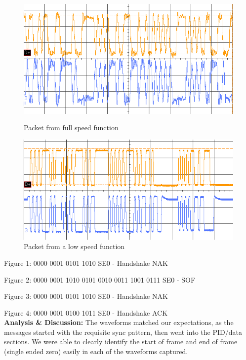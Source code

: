 \documentclass{article}
\newcommand{\sect}[1]{\noindent\textbf{#1}}
\begin{document}
\begin{figure}[H]
\centering
\begin{minipage}[t]{.5\textwidth}
	\centering
	\includegraphics[width=.94\linewidth]{5}
	\caption{Packet from full speed function}
\end{minipage}%
\begin{minipage}[t]{.5\textwidth}
	\centering
	\includegraphics[width=.94\linewidth]{4}
	\caption{Packet from a low speed function}
\end{minipage}
\end{figure}

Figure 1: 0000 0001 0101 1010 SE0 - Handshake NAK

Figure 2: 0000 0001 1010 0101 0010 0011 1001 0111 SE0 - SOF

Figure 3: 0000 0001 0101 1010 SE0 - Handshake NAK

Figure 4: 0000 0001 0100 1011 SE0 - Handshake ACK\\

\sect{Analysis \& Discussion:} The waveforms matched our expectations, as the messages started with the requisite sync pattern, then went into the PID/data sections. We were able to clearly identify the start of frame and end of frame (single ended zero) easily in each of the waveforms captured.\\
\end{document}
